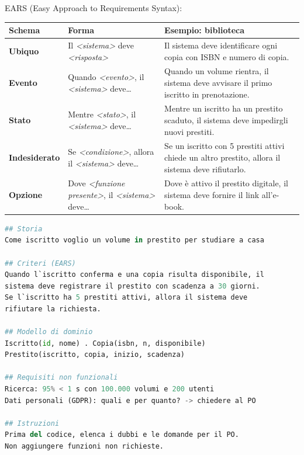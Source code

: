 \documentclass[12pt]{extarticle}
\begin{document}
\noindent EARS (Easy Approach to Requirements Syntax):
\begin{center}
\small
\begin{tabular}{p{2.4cm}p{5.4cm}p{7.4cm}}
    \toprule
    \textbf{Schema} & \textbf{Forma} & \textbf{Esempio: biblioteca} \\
    \midrule
    \textbf{Ubiquo} & Il \textit{<sistema>} deve \textit{<risposta>} & Il sistema deve identificare ogni copia con ISBN e numero di copia. \\
    \addlinespace
    \textbf{Evento} & Quando \textit{<evento>}, il \textit{<sistema>} deve\ldots & Quando un volume rientra, il sistema deve avvisare il primo iscritto in prenotazione. \\
    \addlinespace
    \textbf{Stato} & Mentre \textit{<stato>}, il \textit{<sistema>} deve\ldots & Mentre un iscritto ha un prestito scaduto, il sistema deve impedirgli nuovi prestiti. \\
    \addlinespace
    \textbf{Indesiderato} & Se \textit{<condizione>}, allora il \textit{<sistema>} deve\ldots & Se un iscritto con 5 prestiti attivi chiede un altro prestito, allora il sistema deve rifiutarlo. \\
    \addlinespace
    \textbf{Opzione} & Dove \textit{<funzione presente>}, il \textit{<sistema>} deve\ldots & Dove è attivo il prestito digitale, il sistema deve fornire il link all'e-book. \\
    \bottomrule
\end{tabular}
\end{center}

\begin{lstlisting}[language=Python]
## Storia
Come iscritto voglio un volume in prestito per studiare a casa

## Criteri (EARS)
Quando l`iscritto conferma e una copia risulta disponibile, il
sistema deve registrare il prestito con scadenza a 30 giorni.
Se l`iscritto ha 5 prestiti attivi, allora il sistema deve
rifiutare la richiesta.

## Modello di dominio
Iscritto(id, nome) . Copia(isbn, n, disponibile)
Prestito(iscritto, copia, inizio, scadenza)

## Requisiti non funzionali
Ricerca: 95% < 1 s con 100.000 volumi e 200 utenti
Dati personali (GDPR): quali e per quanto? -> chiedere al PO

## Istruzioni
Prima del codice, elenca i dubbi e le domande per il PO.
Non aggiungere funzioni non richieste.
\end{lstlisting}
\end{document}
